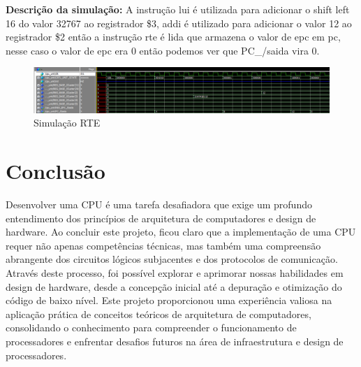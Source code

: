 \textbf{Descrição da simulação:} A instrução lui é utilizada para adicionar o shift left 16 do valor 32767 ao registrador \$3, addi é utilizado para adicionar o valor 12 ao registrador \$2 então a instrução rte é lida que armazena o valor de epc em pc, nesse caso o valor de epc era 0 então podemos ver que PC\_/saida vira 0.  \\

\begin{figure}[htbp!]
\centering
\includegraphics[width=1\textwidth]{figure/simulacao_rte.png}
\caption{Simulação RTE} 
\label{fig:imagem_massa}
\end{figure}


\newpage


\section{Conclusão}

Desenvolver uma CPU é uma tarefa desafiadora que exige um profundo entendimento dos princípios de arquitetura de computadores e design de hardware. Ao concluir este projeto, ficou claro que a implementação de uma CPU requer não apenas competências técnicas, mas também uma compreensão abrangente dos circuitos lógicos subjacentes e dos protocolos de comunicação. Através deste processo, foi possível explorar e aprimorar nossas habilidades em design de hardware, desde a concepção inicial até a depuração e otimização do código de baixo nível. Este projeto proporcionou uma experiência valiosa na aplicação prática de conceitos teóricos de arquitetura de computadores, consolidando o conhecimento para compreender o funcionamento de processadores e enfrentar desafios futuros na área de infraestrutura e design de processadores.
